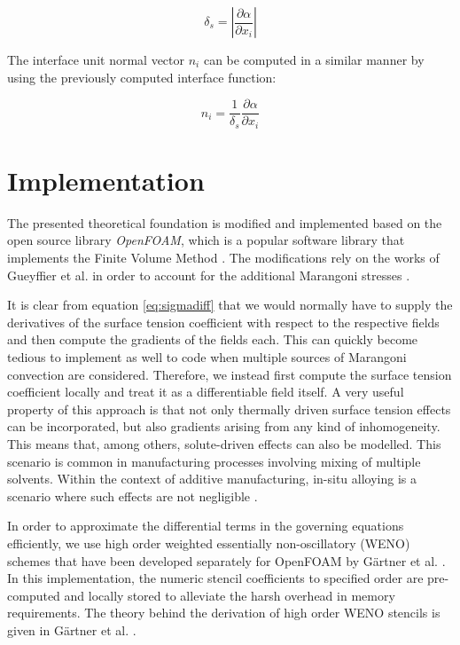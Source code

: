 \documentclass[conference,final,a4paper]{IEEEtran}
\begin{document}
\begin{equation}
    \delta_s = \left\lvert \frac{\partial \alpha}{\partial x_i} \right\rvert
\end{equation}

The interface unit normal vector $n_i$ can be computed in a similar manner by using the previously computed interface function:

\begin{equation}
    n_i = \frac{1}{\delta_s} \frac{\partial \alpha}{\partial x_i}
\end{equation}


\section{Implementation}

The presented theoretical foundation is modified and implemented based on the open source library \textit{OpenFOAM}, which is a popular software library that implements the Finite Volume Method \cite{jasakOpenFOAMLibraryComplex2007}. The modifications rely on the works of Gueyffier et al. in order to account for the additional Marangoni stresses \cite{gueyffierVolumeofFluidInterfaceTracking1999}.

It is clear from equation \ref{eq:sigmadiff} that we would normally have to supply the derivatives of the surface tension coefficient with respect to the respective fields and then compute the gradients of the fields each. This can quickly become tedious to implement as well to code when multiple sources of Marangoni convection are considered. Therefore, we instead first compute the surface tension coefficient locally and treat it as a differentiable field itself.
A very useful property of this approach is that not only thermally driven surface tension effects can be incorporated, but also gradients arising from any kind of inhomogeneity. This means that, among others, solute-driven effects can also be modelled. This scenario is common in manufacturing processes involving mixing of multiple solvents. Within the context of additive manufacturing, in-situ alloying is a scenario where such effects are not negligible \cite{katz-demyanetzInsituAlloyingNovel2020}.

In order to approximate the differential terms in the governing equations efficiently, we use high order weighted essentially non-oscillatory (WENO) schemes that have been developed separately for OpenFOAM by Gärtner et al. \cite{gartnerEfficientWENOLibrary2020,martinImplementationValidationSemiImplicit2018}. In this implementation, the numeric stencil coefficients to specified order are pre-computed and locally stored to alleviate the harsh overhead in memory requirements. The theory behind the derivation of high order WENO stencils is given in Gärtner et al. \cite{gartnerEfficientWENOLibrary2020}.
\end{document}
